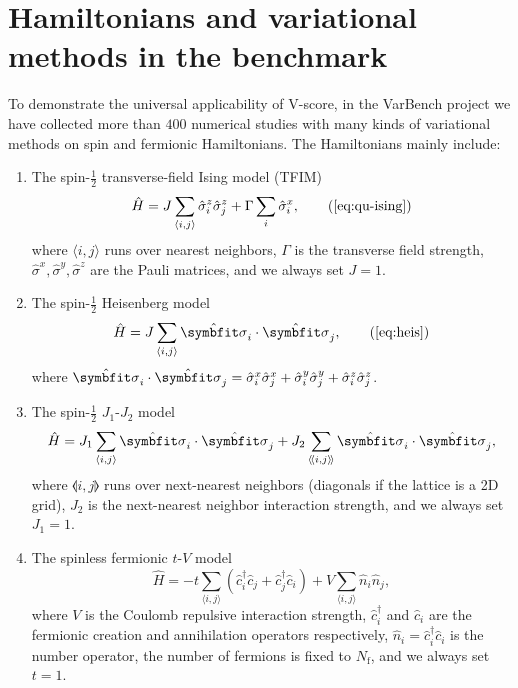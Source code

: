 \section{Hamiltonians and variational methods in the benchmark}

To demonstrate the universal applicability of V-score, in the VarBench project we have collected more than $400$ numerical studies with many kinds of variational methods on spin and fermionic Hamiltonians. The Hamiltonians mainly include:
\begin{enumerate}
\item The spin-$\frac{1}{2}$ transverse-field Ising model (TFIM)
\begin{equation}
\hat{H} = J \sum_{\langle i, j \rangle} \hat{\sigma}^z_i \hat{\sigma}^z_j
+ \Gamma \sum_i \hat{\sigma}^x_i,
\tag{\ref{eq:qu-ising}}
\end{equation}
where $\langle i, j \rangle$ runs over nearest neighbors, $\Gamma$ is the transverse field strength, $\hat{\sigma}^x, \hat{\sigma}^y, \hat{\sigma}^z$ are the Pauli matrices, and we always set $J = 1$.

\item The spin-$\frac{1}{2}$ Heisenberg model
\begin{equation}
\hat{H} = J \sum_{\langle i, j \rangle} \hat{\vsi}_i \cdot \hat{\vsi}_j,
\tag{\ref{eq:heis}}
\end{equation}
where $\hat{\vsi}_i \cdot \hat{\vsi}_j = \hat{\sigma}^x_i \hat{\sigma}^x_j + \hat{\sigma}^y_i \hat{\sigma}^y_j + \hat{\sigma}^z_i \hat{\sigma}^z_j$.

\item The spin-$\frac{1}{2}$ $J_1$-$J_2$ model
\begin{equation}
\hat{H} = J_1 \sum_{\langle i, j \rangle} \hat{\vsi}_i \cdot \hat{\vsi}_j
+ J_2 \sum_{\llangle i, j \rrangle} \hat{\vsi}_i \cdot \hat{\vsi}_j,
\end{equation}
where $\llangle i, j \rrangle$ runs over next-nearest neighbors (diagonals if the lattice is a 2D grid), $J_2$ is the next-nearest neighbor interaction strength, and we always set $J_1 = 1$.

\item The spinless fermionic $t$-$V$ model
\begin{equation}
\hat{H} = -t \sum_{\langle i, j \rangle} \left( \hat{c}^\dagger_i \hat{c}_j + \hat{c}^\dagger_j \hat{c}_i \right)
+ V \sum_{\langle i, j \rangle} \hat{n}_i \hat{n}_j,
\end{equation}
where $V$ is the Coulomb repulsive interaction strength, $\hat{c}^\dagger_i$ and $\hat{c}_i$ are the fermionic creation and annihilation operators respectively, $\hat{n}_i = \hat{c}^\dagger_i \hat{c}_i$ is the number operator, the number of fermions is fixed to $N_\text{f}$, and we always set $t = 1$.


\end{enumerate}
